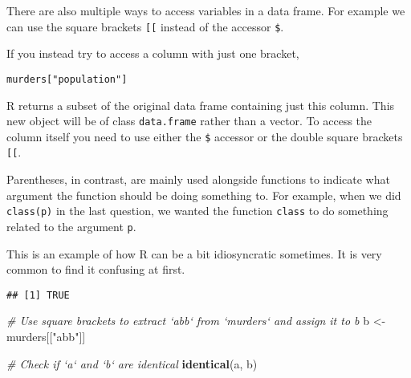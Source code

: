 \documentclass[
]{article}
\newenvironment{Shaded}{\begin{snugshade}}{\end{snugshade}}
\newcommand{\CommentTok}[1]{\textcolor[rgb]{0.56,0.35,0.01}{\textit{#1}}}
\newcommand{\KeywordTok}[1]{\textcolor[rgb]{0.13,0.29,0.53}{\textbf{#1}}}
\newcommand{\NormalTok}[1]{#1}
\newcommand{\OperatorTok}[1]{\textcolor[rgb]{0.81,0.36,0.00}{\textbf{#1}}}
\newcommand{\StringTok}[1]{\textcolor[rgb]{0.31,0.60,0.02}{#1}}
\begin{document}
There are also multiple ways to access variables in a data frame. For
example we can use the square brackets \texttt{{[}{[}} instead of the
accessor \texttt{\$}.

If you instead try to access a column with just one bracket,

\begin{verbatim}
murders["population"]
\end{verbatim}

R returns a subset of the original data frame containing just this
column. This new object will be of class \texttt{data.frame} rather than
a vector. To access the column itself you need to use either the
\texttt{\$} accessor or the double square brackets \texttt{{[}{[}}.

Parentheses, in contrast, are mainly used alongside functions to
indicate what argument the function should be doing something to. For
example, when we did \texttt{class(p)} in the last question, we wanted
the function \texttt{class} to do something related to the argument
\texttt{p}.

This is an example of how R can be a bit idiosyncratic sometimes. It is
very common to find it confusing at first.

\begin{Shaded}
\end{Shaded}

\begin{verbatim}
## [1] TRUE
\end{verbatim}

\begin{Shaded}
\begin{Highlighting}[]
\CommentTok{# Use square brackets to extract `abb` from `murders` and assign it to b}
\NormalTok{b <-}\StringTok{ }\NormalTok{murders[[}\StringTok{"abb"}\NormalTok{]]}

\CommentTok{# Check if `a` and `b` are identical }
\KeywordTok{identical}\NormalTok{(a, b)}
\end{Highlighting}
\end{Shaded}
\end{document}
